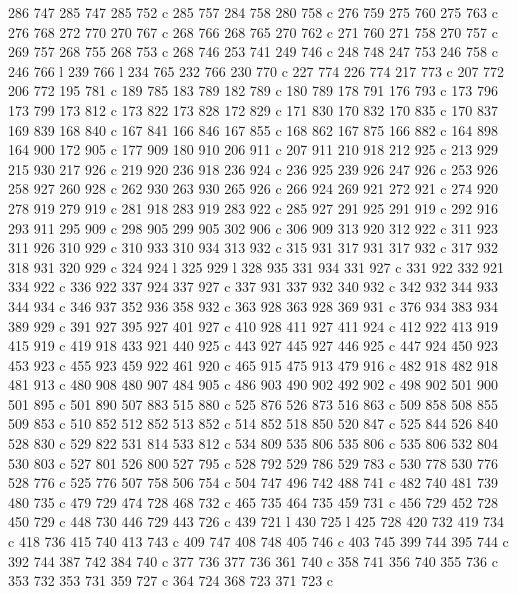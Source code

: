 {{   286 747 285 747 285 752 c
   285 757 284 758 280 758 c
   276 759 275 760 275 763 c
   276 768 272 770 270 767 c
   268 766 268 765 270 762 c
   271 760 271 758 270 757 c
   269 757 268 755 268 753 c
   268 746 253 741 249 746 c
   248 748 247 753 246 758 c
   246 766 l
   239 766 l
   234 765 232 766 230 770 c
   227 774 226 774 217 773 c
   207 772 206 772 195 781 c
   189 785 183 789 182 789 c
   180 789 178 791 176 793 c
   173 796 173 799 173 812 c
   173 822 173 828 172 829 c
   171 830 170 832 170 835 c
   170 837 169 839 168 840 c
   167 841 166 846 167 855 c
   168 862 167 875 166 882 c
   164 898 164 900 172 905 c
   177 909 180 910 206 911 c
   207 911 210 918 212 925 c
   213 929 215 930 217 926 c
   219 920 236 918 236 924 c
   236 925 239 926 247 926 c
   253 926 258 927 260 928 c
   262 930 263 930 265 926 c
   266 924 269 921 272 921 c
   274 920 278 919 279 919 c
   281 918 283 919 283 922 c
   285 927 291 925 291 919 c
   292 916 293 911 295 909 c
   298 905 299 905 302 906 c
   306 909 313 920 312 922 c
   311 923 311 926 310 929 c
   310 933 310 934 313 932 c
   315 931 317 931 317 932 c
   317 932 318 931 320 929 c
   324 924 l
   325 929 l
   328 935 331 934 331 927 c
   331 922 332 921 334 922 c
   336 922 337 924 337 927 c
   337 931 337 932 340 932 c
   342 932 344 933 344 934 c
   346 937 352 936 358 932 c
   363 928 363 928 369 931 c
   376 934 383 934 389 929 c
   391 927 395 927 401 927 c
   410 928 411 927 411 924 c
   412 922 413 919 415 919 c
   419 918 433 921 440 925 c
   443 927 445 927 446 925 c
   447 924 450 923 453 923 c
   455 923 459 922 461 920 c
   465 915 475 913 479 916 c
   482 918 482 918 481 913 c
   480 908 480 907 484 905 c
   486 903 490 902 492 902 c
   498 902 501 900 501 895 c
   501 890 507 883 515 880 c
   525 876 526 873 516 863 c
   509 858 508 855 509 853 c
   510 852 512 852 513 852 c
   514 852 518 850 520 847 c
   525 844 526 840 528 830 c
   529 822 531 814 533 812 c
   534 809 535 806 535 806 c
   535 806 532 804 530 803 c
   527 801 526 800 527 795 c
   528 792 529 786 529 783 c
   530 778 530 776 528 776 c
   525 776 507 758 506 754 c
   504 747 496 742 488 741 c
   482 740 481 739 480 735 c
   479 729 474 728 468 732 c
   465 735 464 735 459 731 c
   456 729 452 728 450 729 c
   448 730 446 729 443 726 c
   439 721 l
   430 725 l
   425 728 420 732 419 734 c
   418 736 415 740 413 743 c
   409 747 408 748 405 746 c
   403 745 399 744 395 744 c
   392 744 387 742 384 740 c
   377 736 377 736 361 740 c
   358 741 356 740 355 736 c
   353 732 353 731 359 727 c
   364 724 368 723 371 723 c
}}
